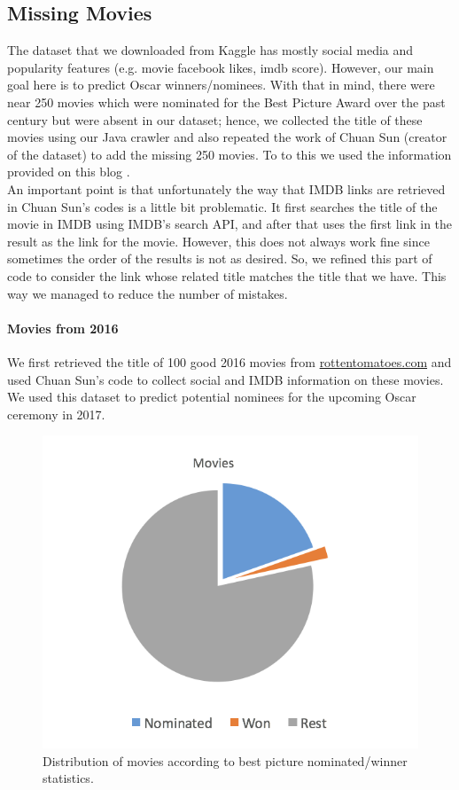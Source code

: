 \documentclass[journal,transmag]{IEEEtran}
\begin{document}
\subsection{Missing Movies}
The dataset that we downloaded from Kaggle has mostly social media and popularity features (e.g. movie facebook likes, imdb score). However, our main goal here is to predict Oscar winners/nominees. With that in mind, there were near 250 movies which were nominated for the Best Picture Award over the past century but were absent in our dataset; hence, we collected the title of these movies using our Java crawler and also repeated the work of Chuan Sun (creator of the dataset) to add the missing 250 movies. To to this we used the information provided on this blog \cite{refCreator}. \\
An important point is that unfortunately  the way that IMDB links are retrieved in Chuan Sun's codes is a little bit problematic. It first searches the title of the movie in IMDB using IMDB's search API, and after that uses the first link in the result as the link for the movie. However, this does not always work fine since sometimes the order of the results is not as desired. So, we refined this part of code to consider the link whose related title matches the title that we have. This way we managed to reduce the number of mistakes.

\paragraph*{Movies from 2016} We first retrieved  the title of 100 good 2016 movies from  \url{rottentomatoes.com} and used Chuan Sun's code to collect social and IMDB information on these movies. We used this dataset to predict potential nominees for the upcoming Oscar ceremony in 2017. 

\begin{figure}

\includegraphics[scale=.45]{fig1.png}
 \caption{Distribution of movies according to best picture nominated/winner statistics.}
\label{fig4}
\end{figure}
\end{document}
